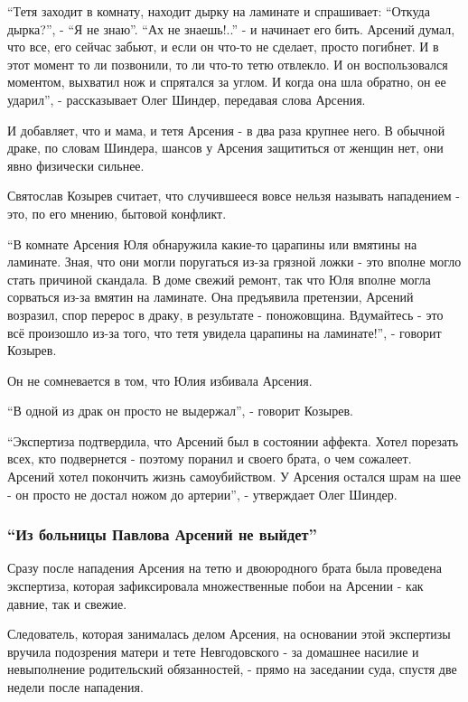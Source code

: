 “Тетя заходит в комнату, находит дырку на ламинате и спрашивает: “Откуда
дырка?”, - “Я не знаю”. “Ах не знаешь!..” - и начинает его бить. Арсений думал,
что все, его сейчас забьют, и если он что-то не сделает, просто погибнет. И в
этот момент то ли позвонили, то ли что-то тетю отвлекло. И он воспользовался
моментом, выхватил нож и спрятался за углом. И когда она шла обратно, он ее
ударил”, - рассказывает Олег Шиндер, передавая слова Арсения. 

И добавляет, что и мама, и тетя Арсения - в два раза крупнее него. В обычной
драке, по словам Шиндера, шансов у Арсения защититься от женщин нет, они явно
физически сильнее. 

Святослав Козырев считает, что случившееся вовсе нельзя называть нападением -
это, по его мнению, бытовой конфликт. 

“В комнате Арсения Юля обнаружила какие-то царапины или вмятины на ламинате.
Зная, что они могли поругаться из-за грязной ложки - это вполне могло стать
причиной скандала. В доме свежий ремонт, так что Юля вполне могла сорваться
из-за вмятин на ламинате. Она предъявила претензии, Арсений возразил, спор
перерос в драку, в результате - поножовщина. Вдумайтесь - это всё произошло
из-за того, что тетя увидела царапины на ламинате!”, - говорит Козырев.  

Он не сомневается в том, что Юлия избивала Арсения.

“В одной из драк он просто не выдержал”, - говорит Козырев. 

“Экспертиза подтвердила, что Арсений был в состоянии аффекта. Хотел порезать
всех, кто подвернется - поэтому поранил и своего брата, о чем сожалеет. Арсений
хотел покончить жизнь самоубийством. У Арсения остался шрам на шее - он просто
не достал ножом до артерии”, - утверждает Олег Шиндер. 

\subsubsection{\enquote{Из больницы Павлова Арсений не выйдет}}

Сразу после нападения Арсения на тетю и двоюродного брата была проведена
экспертиза, которая зафиксировала множественные побои на Арсении - как давние,
так и свежие. 

Следователь, которая занималась делом Арсения, на основании этой экспертизы
вручила подозрения матери и тете Невгодовского - за домашнее насилие и
невыполнение родительский обязанностей, - прямо на заседании суда, спустя две
недели после нападения.

